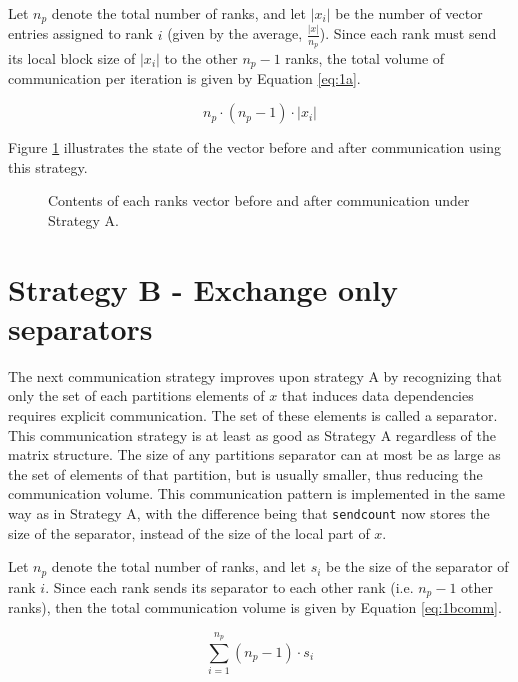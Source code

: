 Let \(n_{p}\) denote the total number of ranks, and let \(\left| x_{i} \right|\) be the number of vector entries assigned to rank \(i\) (given by the average, \(\frac{\left| x \right|}{n_{p}}\)). Since each rank must send its local block size of \(\left| x_{i} \right|\) to the other \(n_{p}-1\) ranks, the total volume of communication per iteration is given by Equation \ref{eq:1a}.

\begin{equation}
    \label{eq:1a}
    n_{p} \cdot  (n_{p}-1) \cdot \left| x_{i} \right|
\end{equation}

Figure \ref{fig:1acomm} illustrates the state of the vector before and after communication using this strategy.

\begin{figure}[H]
    \centering
    \caption{Contents of each ranks vector before and after communication under Strategy A.}
    \label{fig:1acomm}
\end{figure}

\section{Strategy B - Exchange only separators}
The next communication strategy improves upon strategy A by recognizing that only the set of each partitions elements of \(x\) that induces data dependencies requires explicit communication. The set of these elements is called a separator. This communication strategy is at least as good as Strategy A regardless of the matrix structure. The size of any partitions separator can at most be as large as the set of elements of that partition, but is usually smaller, thus reducing the communication volume. This communication pattern is implemented in the same way as in Strategy A, with the difference being that \texttt{sendcount} now stores the size of the separator, instead of the size of the local part of \(x\).
\medskip

Let \(n_{p}\) denote the total number of ranks, and let \(s_{i}\) be the size of the separator of rank \(i\). Since each rank sends its separator to each other rank (i.e. \(n_{p} - 1\) other ranks), then the total communication volume is given by Equation \ref{eq:1bcomm}.

\begin{equation}
    \label{eq:1bcomm}
    \sum_{i=1}^{n_{p}}(n_{p} - 1) \cdot s_{i} 
\end{equation}

